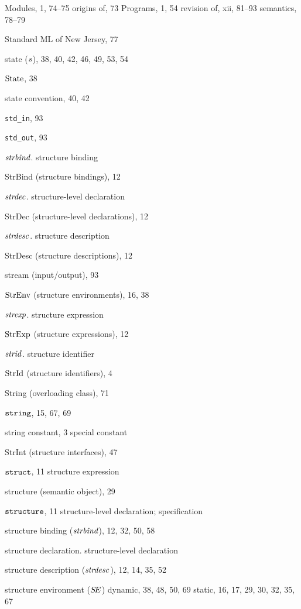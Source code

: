 \begin{theindex}
\subitem Modules, 1, 74--75
\subitem origins of, 73
\subitem Programs, 1, 54
\subitem revision of, xii, 81--93
\subitem semantics, 78--79
\item Standard ML of New Jersey, 77
\item state ($s$), 38, 40, 42, 46, 49, 53, 54
\item ${\rm State}$, 38
\item state convention, 40, 42
\item \verb+std_in+, 93
\item \verb+std_out+, 93
\item ${\it strbind}$. \see structure binding
\item StrBind (structure bindings), 12
\item ${\it strdec}$. \see structure-level declaration
\item StrDec (structure-level declarations), 12
\item ${\it strdesc}$. \see structure description
\item StrDesc (structure descriptions), 12
\item stream (input/output),  93
\item ${\rm StrEnv}$ (structure environments), 16, 38
\item ${\it strexp}$. \see  structure expression
\item ${\rm StrExp}$ (structure expressions), 12
\item ${\it strid}$. \see structure identifier
\item ${\rm StrId}$ (structure identifiers), 4
\item String (overloading class), 71
\item $\mbox{\tt string}$, 15, 67, 69
\item string constant, 3
\subitem \seealso special constant
\item StrInt (structure interfaces), 47
\item ${\tt struct}$, 11
\subitem \seealso structure expression
\item structure (semantic object), 29
\item ${\tt structure}$, 11
\subitem \seealso structure-level declaration; specification
\item structure binding (${\it strbind}$), 12, 32, 50, 58
\item structure declaration. \see structure-level declaration
\item structure description (${\it strdesc}$), 12, 14, 35, 52
\item structure environment ($\mbox{$S\!E$}$) 
\subitem dynamic, 38, 48, 50, 69
\subitem static, 16,  17, 29, 30, 32, 35, 67

\end{theindex}
